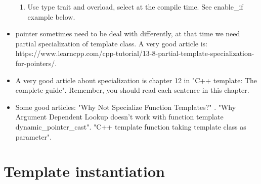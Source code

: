 \documentclass[a4paper,11pt,twoside]{book}
\begin{document}
\begin{itemize}
\begin{enumerate}
\item Use type trait and overload, select at the compile time. See enable\_if example below.

\end{enumerate}

    \item pointer sometimes need to be deal with differently, at that time we need partial specialization of template class. A very good article is:\\ https://www.learncpp.com/cpp-tutorial/13-8-partial-template-specialization-for-pointers/. 

    \item A very good article about specialization is chapter 12 in "C++ template: The complete guide". Remember, you should read each sentence in this chapter.
    
    \item Some good articles:\newline
    "Why Not Specialize Function Templates?" .
    \newline
    "Why Argument Dependent Lookup doesn't work with function template dynamic\_pointer\_cast". 
    \newline
    "C++ template function taking template class as parameter".
\end{itemize}


\section{Template instantiation}
\end{document}
